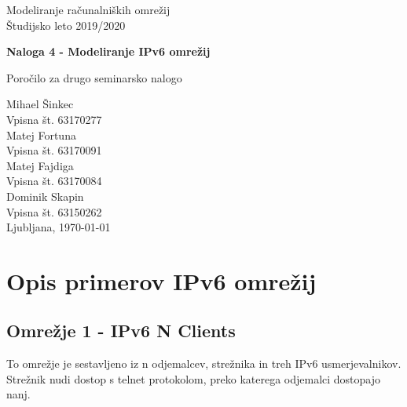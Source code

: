 \documentclass[11pt,a4paper,slovene]{myarticle}
\begin{document}
\label{naslov}
\thispagestyle{empty}

\begin{center}
\begin{Large}
Modeliranje računalniških omrežij\\
Študijsko leto 2019/2020\\
\end{Large}

\vspace*{4cm}
\begin{LARGE}
\textbf{Naloga 4 - Modeliranje IPv6 omrežij\\}
\end{LARGE}
\vspace*{0.5cm}

\begin{Large}
Poročilo za drugo seminarsko nalogo\\

\vspace*{4cm}

Mihael Šinkec\\
Vpisna št. 63170277\\
Matej Fortuna\\
Vpisna št. 63170091\\
Matej Fajdiga\\
Vpisna št. 63170084\\
Dominik Skapin\\
Vpisna št. 63150262\\

\vspace*{2cm}
Ljubljana, \today
\end{Large}
\end{center}

\pagebreak
\setcounter{page}{1}


\label{Kazalo}
\tableofcontents
\thispagestyle{empty}
\pagebreak

\section{Opis primerov IPv6 omrežij}
\subsection{Omrežje 1 - IPv6 N Clients}
To omrežje je sestavljeno iz n odjemalcev, strežnika in treh IPv6 usmerjevalnikov. Strežnik nudi dostop s telnet protokolom, preko katerega odjemalci dostopajo nanj.
\end{document}
